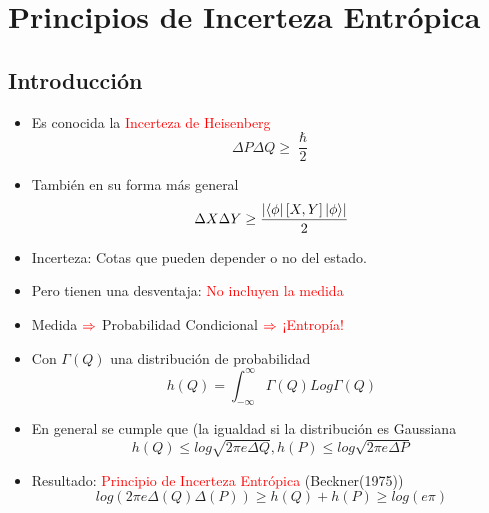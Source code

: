 \documentclass{book}
\begin{document}
\chapter{Principios de Incerteza Entrópica}
\section{Introducción}
\begin{itemize}
    \item Es conocida la \textcolor{red}{Incerteza de Heisenberg}
    \begin{equation}\label{eq4.1}\Delta P \Delta Q \geq \frac{ \hslash}{2}\end{equation}
    \item También en su forma más general
    \begin{equation}\label{eq4.2}\Delta X\Delta Y \geq  \frac{\lvert\bra{\phi}[X,Y]\ket{\phi}\rvert}{2}\end{equation}
    \item Incerteza: Cotas que pueden depender o no del estado.
    \item Pero tienen una desventaja: \textcolor{red}{No incluyen la medida}
\end{itemize}
\begin{itemize}
    \item Medida $\textcolor{red}{\Rightarrow}$ Probabilidad Condicional $\textcolor{red}{\Rightarrow}$ \textcolor{red}{¡Entropía!}
    \item Con $\Gamma(Q)$ una distribución de probabilidad
    \begin{equation}\label{eq4.3}h(Q)=\int_{-\infty}^\infty \Gamma(Q) Log\Gamma(Q) \end{equation}
    \item En general se cumple que (la igualdad si la distribución es Gaussiana
    \begin{equation}\label{eq4.4}h(Q)\leq log \sqrt{2\pi e \Delta Q},   h(P)\leq log \sqrt{2\pi e \Delta P}\end{equation}
    \item  Resultado: \textcolor{red}{Principio de Incerteza Entrópica} (Beckner(1975))
    \begin{equation}\label{eq4.5}log(2\pi e \Delta(Q)\Delta(P))\geq h(Q)+h(P) \geq log(e\pi) \end{equation}
\end{itemize}
\end{document}
